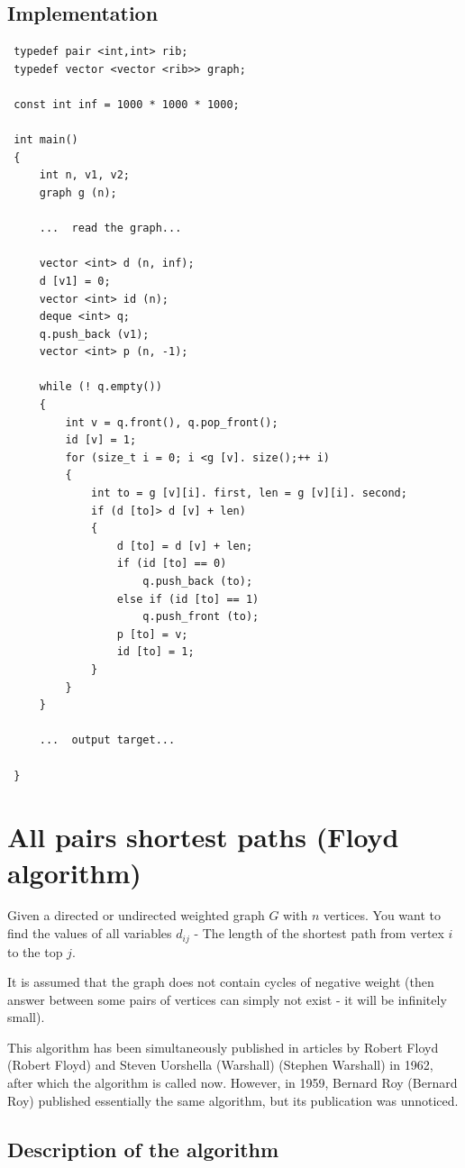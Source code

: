 \subsection{ Implementation } \begin{verbatim}
 typedef pair <int,int> rib;
 typedef vector <vector <rib>> graph;

 const int inf = 1000 * 1000 * 1000;

 int main()
 {
     int n, v1, v2;
     graph g (n);

     ...  read the graph...

     vector <int> d (n, inf);
     d [v1] = 0;
     vector <int> id (n);
     deque <int> q;
     q.push_back (v1);
     vector <int> p (n, -1);

     while (! q.empty())
     {
         int v = q.front(), q.pop_front();
         id [v] = 1;
         for (size_t i = 0; i <g [v]. size();++ i)
         {
             int to = g [v][i]. first, len = g [v][i]. second;
             if (d [to]> d [v] + len)
             {
                 d [to] = d [v] + len;
                 if (id [to] == 0)
                     q.push_back (to);
                 else if (id [to] == 1)
                     q.push_front (to);
                 p [to] = v;
                 id [to] = 1;
             }
         }
     }

     ...  output target...

 } 
\end{verbatim}
\section{ All pairs shortest paths (Floyd algorithm) }
Given a directed or undirected weighted graph $G$ with $n$ vertices. You want to find the values ​​of all variables $d_ {ij}$ - The length of the shortest path from vertex $i$ to the top $j$.

It is assumed that the graph does not contain cycles of negative weight (then answer between some pairs of vertices can simply not exist - it will be infinitely small).

This algorithm has been simultaneously published in articles by Robert Floyd (Robert Floyd) and Steven Uorshella (Warshall) (Stephen Warshall) in 1962, after which the algorithm is called now. However, in 1959, Bernard Roy (Bernard Roy) published essentially the same algorithm, but its publication was unnoticed.

\subsection{ Description of the algorithm }

